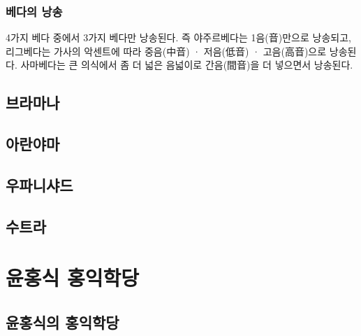 \documentclass[12pt, a4paper, oneside]{book}
\let\stdsection\section
\renewcommand\section{\newpage\stdsection}
\begin{document}
\subsection{베다의 낭송}
4가지 베다 중에서 3가지 베다만 낭송된다. 
즉 야주르베다는 1음(音)만으로 낭송되고, 리그베다는 가사의 악센트에 따라 중음(中音) · 저음(低音) · 고음(高音)으로 낭송된다. 
사마베다는 큰 의식에서 좀 더 넓은 음넓이로 간음(間音)을 더 넣으면서 낭송된다.





\section{브라마나}


\section{아란야마}


\section{우파니샤드}


\section{수트라}



	\chapter{윤홍식 홍익학당}



%
	\section{윤홍식의 홍익학당}
\end{document}
